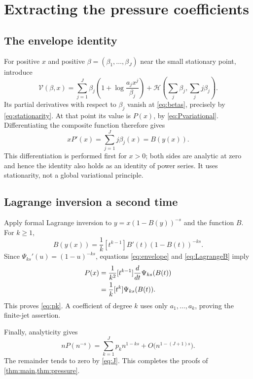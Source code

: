 \documentclass[11pt,a4paper]{article}
\theoremstyle{definition}
\theoremstyle{remark}
\numberwithin{equation}{section}
\begin{document}
\section{Extracting the pressure coefficients}\label{sec:extraction}

\subsection{The envelope identity}
For positive $x$ and positive $\beta=(\beta_1,\ldots,\beta_J)$ near
the small stationary point, introduce
\begin{equation}
 \mathcal V(\beta,x)=
 \sum_{j=1}^J\beta_j
       \left(1+\log\frac{a_jx^j}{\beta_j}\right)
 +\mathcal H\left(\sum_j\beta_j,\sum_jj\beta_j\right).
 \label{eq:variational}
\end{equation}
Its partial derivatives with respect to $\beta_j$ vanish at
\eqref{eq:betas}, precisely by \eqref{eq:stationarity}.
At that point its value is $P(x)$, by \eqref{eq:Pvariational}.
Differentiating the composite function therefore gives
\begin{equation}
 xP'(x)=\sum_{j=1}^Jj\beta_j(x)=B(y(x)).
 \label{eq:envelope}
\end{equation}
This differentiation is performed first for $x>0$; both sides are
analytic at zero and hence the identity also holds as an identity of
power series. It uses stationarity, not a global variational principle.

\subsection{Lagrange inversion a second time}
Apply formal Lagrange inversion to $y=x(1-B(y))^{-s}$ and the
function $B$. For $k\ge1$,
\begin{equation}
 [x^k]B(y(x))
 =\frac1k[t^{k-1}]B'(t)(1-B(t))^{-ks}.
 \label{eq:LagrangeB}
\end{equation}
Since $\Psi_{ks}'(u)=(1-u)^{-ks}$, equations
\eqref{eq:envelope} and \eqref{eq:LagrangeB} imply
\begin{align}
 [x^k]P(x)
 &=\frac1{k^2}[t^{k-1}]\frac{d}{dt}\Psi_{ks}(B(t))\notag\\
 &=\frac1k[t^k]\Psi_{ks}(B(t)).
 \label{eq:pkproof}
\end{align}
This proves \eqref{eq:pk}. A coefficient of degree $k$ uses only
$a_1,\ldots,a_k$, proving the finite-jet assertion.

Finally, analyticity gives
\[
 nP(n^{-s})=\sum_{k=1}^Jp_kn^{1-ks}
                 +O\bigl(n^{1-(J+1)s}\bigr).
\]
The remainder tends to zero by \eqref{eq:J}. This completes the proofs
of \cref{thm:main,thm:pressure}.
\end{document}
